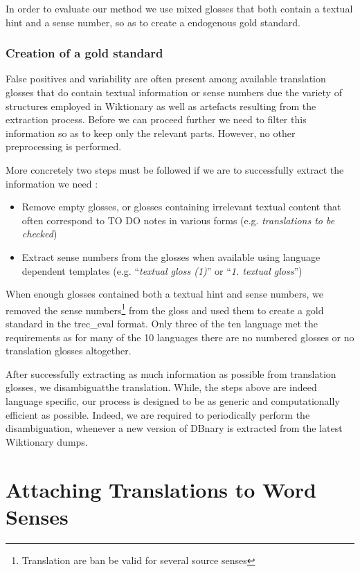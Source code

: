 \documentclass[10pt, a4paper]{article}
\begin{document}
In order to evaluate our method we use mixed glosses that both contain a textual hint and a sense number, so as to create a endogenous gold standard.

\subsubsection{Creation of a gold standard}

False positives and variability are often present among available translation glosses that do contain textual information or sense numbers due the variety of structures employed in Wiktionary as well as artefacts resulting from the extraction process. Before we can proceed further we need to filter this information so as to keep only the relevant parts. However, no other preprocessing is performed.

More concretely two steps must be followed if we are to successfully extract the information we need :
\begin{itemize}
   \item Remove empty glosses, or glosses containing irrelevant textual content that often correspond to TO DO notes in various forms (e.g. \emph{translations to be checked})
   \item Extract sense numbers from the glosses when available using language dependent templates (e.g. ``\emph{textual gloss (1)}'' or ``\emph{1. textual gloss}'') 
\end{itemize}

When enough glosses contained both a textual hint and sense numbers, we removed the sense numbers\footnote{Translation are ban be valid for several source senses} from the gloss and used them to create a gold standard in the trec\_eval format. Only three of the ten language met the requirements as for many of the 10 languages there are no numbered glosses or no translation glosses altogether.

After successfully extracting as much information as possible from translation glosses, we disambiguatthe translation. While, the steps above are indeed language specific, our process is designed to be as generic and computationally efficient as possible. Indeed, we are required to periodically perform the disambiguation, whenever a new version of DBnary is extracted from the latest Wiktionary dumps.

\section{Attaching Translations to Word Senses}
\end{document}
